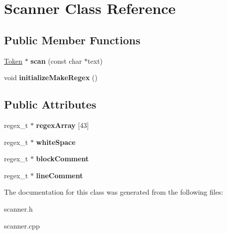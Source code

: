 \hypertarget{classScanner}{\section{Scanner Class Reference}
\label{classScanner}
}
\subsection*{Public Member Functions}
\begin{DoxyCompactItemize}
\item 
\hypertarget{classScanner_a40f021dac0075b146272e42d425b2ba5}{\hyperlink{classToken}{Token} $\ast$ {\bfseries scan} (const char $\ast$text)}\label{classScanner_a40f021dac0075b146272e42d425b2ba5}

\item 
\hypertarget{classScanner_a38c798b492af63e794c1828d97972e09}{void {\bfseries initialize\-Make\-Regex} ()}\label{classScanner_a38c798b492af63e794c1828d97972e09}

\end{DoxyCompactItemize}
\subsection*{Public Attributes}
\begin{DoxyCompactItemize}
\item 
\hypertarget{classScanner_afc54b08c413bfedb65bd07f6a7f1fe7c}{regex\-\_\-t $\ast$ {\bfseries regex\-Array} \mbox{[}43\mbox{]}}\label{classScanner_afc54b08c413bfedb65bd07f6a7f1fe7c}

\item 
\hypertarget{classScanner_aa60d16396eef75f457036d05e225d23c}{regex\-\_\-t $\ast$ {\bfseries white\-Space}}\label{classScanner_aa60d16396eef75f457036d05e225d23c}

\item 
\hypertarget{classScanner_a00a0ab90d2a971c2d7dc8c14c1baa5ac}{regex\-\_\-t $\ast$ {\bfseries block\-Comment}}\label{classScanner_a00a0ab90d2a971c2d7dc8c14c1baa5ac}

\item 
\hypertarget{classScanner_a338ac417317a864b7236b058ebd02806}{regex\-\_\-t $\ast$ {\bfseries line\-Comment}}\label{classScanner_a338ac417317a864b7236b058ebd02806}

\end{DoxyCompactItemize}


The documentation for this class was generated from the following files\-:\begin{DoxyCompactItemize}
\item 
scanner.\-h\item 
scanner.\-cpp\end{DoxyCompactItemize}
